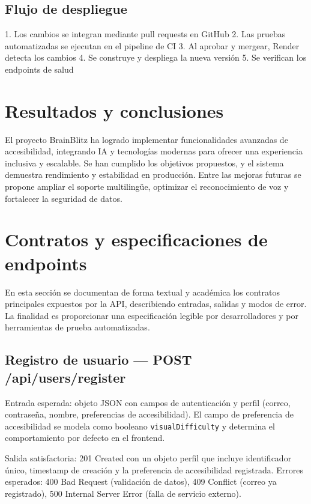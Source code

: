 \documentclass[12pt]{article}
\begin{document}
\subsection{Flujo de despliegue}
1. Los cambios se integran mediante pull requests en GitHub
2. Las pruebas automatizadas se ejecutan en el pipeline de CI
3. Al aprobar y mergear, Render detecta los cambios
4. Se construye y despliega la nueva versión
5. Se verifican los endpoints de salud

\section{Resultados y conclusiones}
El proyecto BrainBlitz ha logrado implementar funcionalidades avanzadas de accesibilidad, integrando IA y tecnologías modernas para ofrecer una experiencia inclusiva y escalable. Se han cumplido los objetivos propuestos, y el sistema demuestra rendimiento y estabilidad en producción. Entre las mejoras futuras se propone ampliar el soporte multilingüe, optimizar el reconocimiento de voz y fortalecer la seguridad de datos.




\section{Contratos y especificaciones de endpoints}
En esta sección se documentan de forma textual y académica los contratos principales expuestos por la API, describiendo entradas, salidas y modos de error. La finalidad es proporcionar una especificación legible por desarrolladores y por herramientas de prueba automatizadas.

\subsection{Registro de usuario — POST /api/users/register}
Entrada esperada: objeto JSON con campos de autenticación y perfil (correo, contraseña, nombre, preferencias de accesibilidad). El campo de preferencia de accesibilidad se modela como booleano \texttt{visualDifficulty} y determina el comportamiento por defecto en el frontend.

Salida satisfactoria: 201 Created con un objeto perfil que incluye identificador único, timestamp de creación y la preferencia de accesibilidad registrada. Errores esperados: 400 Bad Request (validación de datos), 409 Conflict (correo ya registrado), 500 Internal Server Error (falla de servicio externo).
\end{document}
